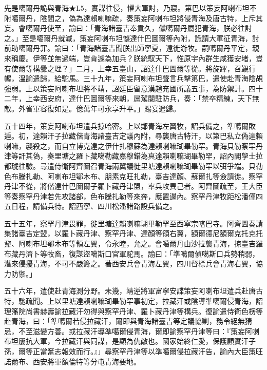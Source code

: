 \begin{pinyinscope}
先是噶爾丹詭與青海★L5，實謀往侵，懼大軍討，乃寢。第巴以策妄阿喇布坦不附噶爾丹，陰間之，偽為達賴喇嘛疏，奏策妄阿喇布坦將侵青海及唐古特，上斥其妄。會噶爾丹使至，諭曰：「青海諸臺吉奉貢久，儻噶爾丹屬犯青海，朕必往討之。」至是噶爾丹就滅，策妄阿喇布坦憾達什巴圖爾等內附，詭請大軍征青海，討前助噶爾丹罪。諭曰：「青海諸臺吉聞朕出師寧夏，遠徙游牧。嗣噶爾丹平定，親來稱慶。伊等並無過端，豈肯遽為加兵？朕統馭天下，惟原宇內群生咸獲安堵，豈有使爾等構釁之理？」二月，上幸五臺山，詔達什巴圖爾等從。將旋蹕，召覲行幄，溫諭遣歸，給駝馬。三十九年，策妄阿喇布坦聲言兵擊第巴，遣使赴青海陰覘強弱。上以策妄阿喇布坦將不靖，詔廷臣留意漢趙充國所議五事，為防禦計。四十二年，上幸西安府，達什巴圖爾等來朝，扈駕閱駐防兵，奏：「禁卒精練，天下無敵。外省軍容復如是。億萬年可永享升平。」賜宴遣歸。

五十四年，策妄阿喇布坦遣兵掠哈密。上以鄰青海左翼牧，詔兵備之，準噶爾敗遁。初，達賴汗子拉藏偕青海諸臺吉定議內附，尋襲唐古特汗，以第巴私立偽達賴喇嘛，襲殺之，而自立博克達之伊什扎穆蘇為達賴喇嘛瑚畢勒罕。青海貝勒察罕丹津等訐其偽，奏里塘之羅卜藏噶勒藏嘉穆錯為真達賴喇嘛瑚畢勒罕，詔內閣學士拉都琥往驗。尋遣侍衛阿齊圖召青海兩翼議徙里塘達賴喇嘛瑚畢勒罕以弭爭端。貝勒色布騰扎勒、阿喇布坦鄂木布、朋素克旺扎勒，臺吉達顏、蘇爾扎等僉請徙。察罕丹津不從，將偕達什巴圖爾子羅卜藏丹津盟，率兵攻異己者。阿齊圖疏至，王大臣等奏察罕丹津若先攻諸部，色布騰扎勒等來奔，應置邊內。察罕丹津牧距松潘僅四五日程，請備兵待。詔西寧、四川松潘諸路設兵備之。

五十五年，察罕丹津畏罪，徙里塘達賴喇嘛瑚畢勒罕至西寧宗喀巴寺。阿齊圖奏請集諸臺吉定盟，以羅卜藏丹津、察罕丹津、達顏等領右翼，額爾德尼額爾克托克托鼐、阿喇布坦鄂木布等領左翼，令永睦，允之。會噶爾丹由沙拉襲青海，掠臺吉羅布藏丹濟卜等牧畜，復謀盜噶斯口官軍駝馬。諭曰：「準噶爾偵噶斯口兵勢稍弱，潛來侵擾青海，不可不嚴籌之。著西安兵會青海左翼，四川督標兵會青海右翼，協力防禦。」

五十六年，遣使赴青海測分野。未幾，靖逆將軍富寧安諜策妄阿喇布坦遣兵赴唐古特，馳疏聞。上以里塘達賴喇嘛瑚畢勒罕事初定，拉藏汗或陰導準噶爾侵青海，詔理籓院尚書赫壽諭拉藏汗勿得與察罕丹津、羅卜藏丹津等構兵。復諭遣侍衛色楞等赴青海，曰：「準噶爾若侵拉藏汗，爾即與青海諸臺吉等定議協剿，務令絕無猜忌，不至滋變方善。或拉藏汗導準噶爾侵青海，爾即諭察罕丹津等曰：『策妄阿喇布坦屢抗大軍，今拉藏汗與同謀，是顯為仇敵也。國家始終仁愛，保護顧實汗子孫，爾等正當奮志報效而行。』」尋察罕丹津等以準噶爾侵拉藏汗告，諭內大臣策旺諾爾布、西安將軍額倫特等分屯青海要地。


\end{pinyinscope}
